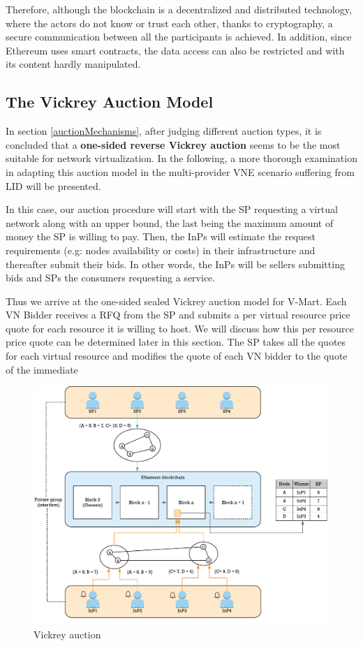 Therefore, although the blockchain is a decentralized and distributed technology, where the actors do not know or trust each other, thanks to cryptography, a secure communication between all the participants is achieved. In addition, since Ethereum uses smart contracts, the data access can also be restricted and with its content hardly manipulated.

\subsection{The Vickrey Auction Model} \label{vickrey}

In section \ref{auctionMechanisms}, after judging different auction types, it is concluded that a \textbf{one-sided reverse Vickrey auction} seems to be the most suitable for network virtualization. In the following, a more thorough examination in adapting this auction model in the multi-provider VNE scenario suffering from LID will be presented.

In this case, our auction procedure will start with the SP requesting a virtual network along with an upper bound, the last being the maximum amount of money the SP is willing to pay. Then, the InPs will estimate the request requirements (e.g: nodes availability or costs) in their infrastructure and thereafter submit their bids. In other words, the InPs will be sellers submitting bids and SPs the consumers requesting a service.

Thus we arrive at the one-sided sealed Vickrey auction
model for V-Mart. Each VN Bidder receives a RFQ from the SP and submits a per virtual resource price quote for each resource it is willing to host. We will discuss how this per resource price quote can be determined later in this section. The SP takes all the quotes for each virtual resource and modifies the quote of each VN bidder to the quote of the
immediate


\begin{figure}[bth]
	\centering
	\includegraphics[width=0.9\linewidth]{gfx/vickrey}    
  	\caption{Vickrey auction}
  	\label{fig:vickreyAuction}
\end{figure}

